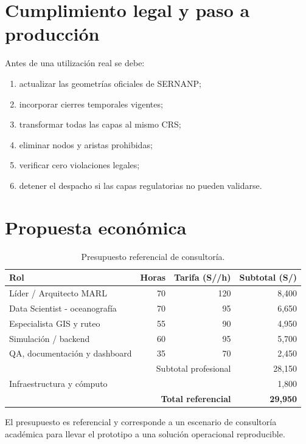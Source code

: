 \section{Cumplimiento legal y paso a producción}
Antes de una utilización real se debe:
\begin{enumerate}[label=\arabic*.]
\item actualizar las geometrías oficiales de SERNANP;
\item incorporar cierres temporales vigentes;
\item transformar todas las capas al mismo CRS;
\item eliminar nodos y aristas prohibidas;
\item verificar cero violaciones legales;
\item detener el despacho si las capas regulatorias no pueden validarse.
\end{enumerate}
\section{Propuesta económica}
\begin{table}[H]
\centering
\caption{Presupuesto referencial de consultoría.}
\begin{tabular}{lrrr}
\toprule
Rol & Horas & Tarifa (S//h) & Subtotal (S/) \\
\midrule
Líder / Arquitecto MARL & 70 & 120 & 8,400 \\
Data Scientist - oceanografía & 70 & 95 & 6,650 \\
Especialista GIS y ruteo & 55 & 90 & 4,950 \\
Simulación / backend & 60 & 95 & 5,700 \\
QA, documentación y dashboard & 35 & 70 & 2,450 \\
\midrule
\multicolumn{3}{r}{Subtotal profesional} & 28,150 \\
Infraestructura y cómputo & & & 1,800 \\
\midrule
\multicolumn{3}{r}{\textbf{Total referencial}} & \textbf{29,950} \\
\bottomrule
\end{tabular}
\end{table}
El presupuesto es referencial y corresponde a un escenario de consultoría académica para llevar el prototipo a una solución operacional reproducible.
